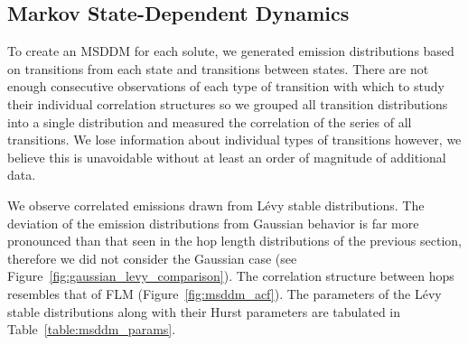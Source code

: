 \documentclass{article}
\begin{document}


  \subsection{Markov State-Dependent Dynamics}\label{section:msm_results}
  
  To create an MSDDM for each solute, we generated emission distributions based 
  on transitions from each state and transitions between states. There are not
  enough consecutive observations of each type of transition with which to study
  their individual correlation structures so we grouped all transition distributions
  into a single distribution and measured the correlation of the series of all 
  transitions. We lose information about individual types of transitions however, 
  we believe this is unavoidable without at least an order of magnitude of additional data.
  
  We observe correlated emissions drawn from L\'evy stable distributions.
  The deviation of the emission distributions from Gaussian behavior is far more pronounced
  than that seen in the hop length distributions of the previous section, therefore we 
  did not consider the Gaussian case (see Figure~\ref{fig:gaussian_levy_comparison}).
  The correlation structure between hops resembles that of FLM (Figure~\ref{fig:msddm_acf}).
  The parameters of the L\'evy stable distributions along with their Hurst parameters 
  are tabulated in Table~\ref{table:msddm_params}. 
  
\end{document}
